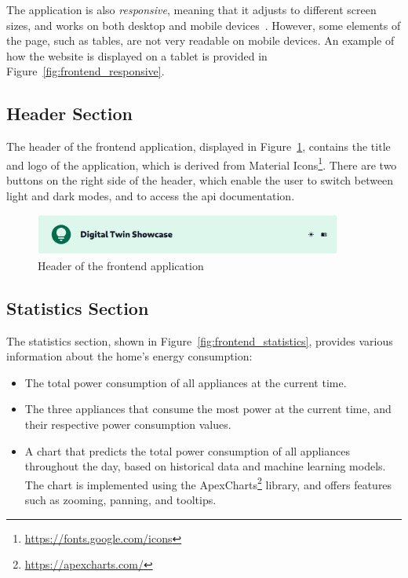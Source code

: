 The application is also \textit{responsive}, meaning that it adjusts to different screen sizes, and works on both desktop and mobile devices~\parencite{marcotteResponsiveWebDesign2010}. However, some elements of the page, such as tables, are not very readable on mobile devices. An example of how the website is displayed on a tablet is provided in Figure~\ref{fig:frontend_responsive}. 

\subsection{Header Section}

The header of the frontend application, displayed in Figure~\ref{fig:frontend_header}, contains the title and logo of the application, which is derived from Material Icons\footnote{\url{https://fonts.google.com/icons}}. There are two buttons on the right side of the header, which enable the user to switch between light and dark modes, and to access the \acrshort{api} documentation.

\begin{figure}
    \centering
    \includegraphics[width=0.9\textwidth]{images/frontend/header.png}
    \caption{Header of the frontend application}%
    \label{fig:frontend_header}
\end{figure}

\subsection{Statistics Section}

The statistics section, shown in Figure~\ref{fig:frontend_statistics}, provides various information about the home's energy consumption:
\begin{itemize}
    \item The total power consumption of all appliances at the current time.
    \item The three appliances that consume the most power at the current time, and their respective power consumption values.
    \item A chart that predicts the total power consumption of all appliances throughout the day, based on historical data and machine learning models. The chart is implemented using the ApexCharts\footnote{\url{https://apexcharts.com/}} library, and offers features such as zooming, panning, and tooltips.
\end{itemize}

